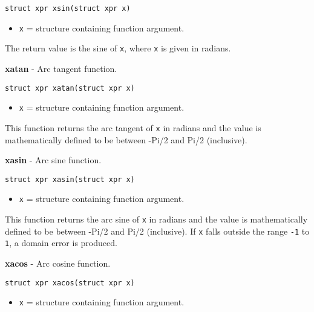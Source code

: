 \documentclass{article}
\begin{document}
\begin{verbatim}
struct xpr xsin(struct xpr x)
\end{verbatim}

\begin{itemize}
\item \texttt{x} = structure containing function argument.
\end{itemize}

The return value is the sine of \texttt{x}, where \texttt{x} is
given in radians.


\hrulefill{}

\textbf{xatan} - Arc tangent function.

\begin{verbatim}
struct xpr xatan(struct xpr x)
\end{verbatim}

\begin{itemize}
\item \texttt{x} = structure containing function argument.
\end{itemize}

This function returns the arc tangent of \texttt{x} in radians and
the  value  is  mathematically defined to be between -Pi/2
and Pi/2 (inclusive).


\hrulefill{}

\textbf{xasin} - Arc sine function.

\begin{verbatim}
struct xpr xasin(struct xpr x)
\end{verbatim}

\begin{itemize}
\item \texttt{x} = structure containing function argument.
\end{itemize}

This function  returns the arc sine of \texttt{x} in radians and
the value is mathematically defined to  be  between  -Pi/2
and Pi/2 (inclusive). If \texttt{x} falls outside  the  range
\texttt{-1} to \texttt{1}, a domain error is produced.


\hrulefill{}

\textbf{xacos} - Arc cosine function.

\begin{verbatim}
struct xpr xacos(struct xpr x)
\end{verbatim}

\begin{itemize}
\item \texttt{x} = structure containing function argument.
\end{itemize}
\end{document}
